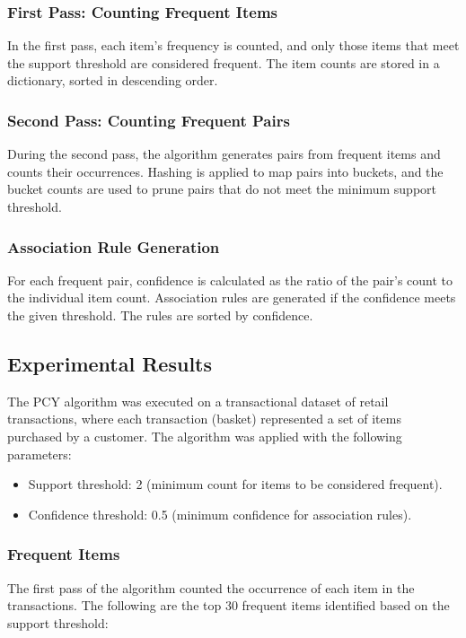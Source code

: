 \subsubsection{First Pass: Counting Frequent Items}
In the first pass, each item’s frequency is counted, and only those items that meet the support threshold are considered frequent.
The item counts are stored in a dictionary, sorted in descending order.

\subsubsection{Second Pass: Counting Frequent Pairs}
During the second pass, the algorithm generates pairs from frequent items and counts their occurrences.
Hashing is applied to map pairs into buckets, and the bucket counts are used to prune pairs that do not meet the minimum support threshold.

\subsubsection{Association Rule Generation}
For each frequent pair, confidence is calculated as the ratio of the pair’s count to the individual item count.
Association rules are generated if the confidence meets the given threshold.
The rules are sorted by confidence.

\subsection{Experimental Results}
\label{subsec:experimental-results}
The PCY algorithm was executed on a transactional dataset of retail transactions, where each transaction (basket) represented a set of items purchased by a customer.
The algorithm was applied with the following parameters:
\begin{itemize}
    \item Support threshold: 2 (minimum count for items to be considered frequent).
    \item Confidence threshold: 0.5 (minimum confidence for association rules).
\end{itemize}

\subsubsection{Frequent Items}
The first pass of the algorithm counted the occurrence of each item in the transactions.
The following are the top 30 frequent items identified based on the support threshold:

